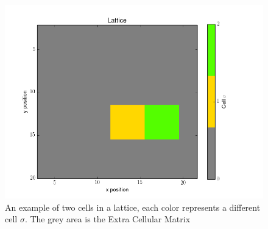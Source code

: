 \documentclass[12pt]{article}
\begin{document}
\begin{figure}[h]
	\centering
	\includegraphics[scale=0.5]{img/basic}
	\caption{An example of two cells in a lattice, each color represents a different cell $\sigma$. The grey area is the Extra Cellular Matrix}
	\label{basic}
\end{figure}
\end{document}
